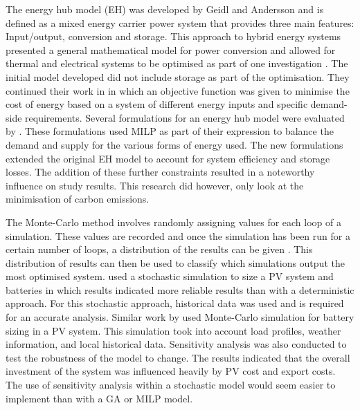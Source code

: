 The energy hub model (EH) was developed by Geidl and Andersson \cite{Geidl1} and 
is defined as a mixed energy carrier power system that provides three main 
features: Input/output, conversion and storage. This approach to hybrid 
energy systems presented a general mathematical model for power conversion 
and allowed for thermal and electrical systems to be optimised as part of 
one investigation \cite{Geidl1}. The initial model developed did not include storage 
as part of the optimisation. They continued their work in \cite{Geidl2} in which an 
objective function was given to minimise the cost of energy based on a 
system of different energy inputs and specific demand-side requirements. 
Several formulations for an energy hub model were evaluated by \cite{EVINS2014387}. These 
formulations used MILP as part of their expression to balance the demand 
and supply for the various forms of energy used. The new formulations 
extended the original EH model to account for system efficiency and storage 
losses. The addition of these further constraints resulted in a noteworthy 
influence on study results. This research did however, only look at the 
minimisation of carbon emissions.

The Monte-Carlo method involves randomly assigning values for each loop of 
a simulation. These values are recorded and once the simulation has been 
run for a certain number of loops, a distribution of the results can be 
given \cite{prob}. This distribution of results can then be used to classify which 
simulations output the most optimised system. \cite{CABRAL20101628} used a stochastic 
simulation to size a PV system and batteries in which results indicated 
more reliable results than with a deterministic approach. For this 
stochastic approach, historical data was used and is required for an 
accurate analysis. Similar work by \cite{TAN20105082} used Monte-Carlo simulation for 
battery sizing in a PV system. This simulation took into account load 
profiles, weather information, and local historical data. Sensitivity 
analysis was also conducted to test the robustness of the model to change. 
The results indicated that the overall investment of the system was 
influenced heavily by PV cost and export costs. The use of sensitivity 
analysis within a stochastic model would seem easier to implement than 
with a GA or MILP model.


